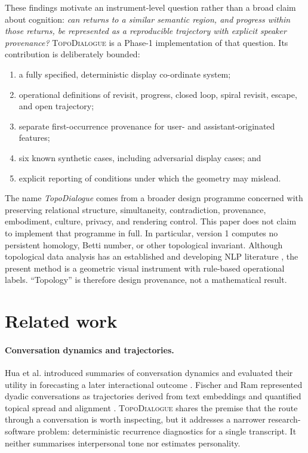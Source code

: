 \documentclass[11pt]{article}
\newcommand{\system}{\textsc{TopoDialogue}}
\begin{document}
These findings motivate an instrument-level question rather than a broad claim
about cognition: \emph{can returns to a similar semantic region, and progress
within those returns, be represented as a reproducible trajectory with explicit
speaker provenance?} \system{} is a Phase-1 implementation of that question.
Its contribution is deliberately bounded:

\begin{enumerate}
  \item a fully specified, deterministic display co-ordinate system;
  \item operational definitions of revisit, progress, closed loop, spiral
        revisit, escape, and open trajectory;
  \item separate first-occurrence provenance for user- and assistant-originated
        features;
  \item six known synthetic cases, including adversarial display cases; and
  \item explicit reporting of conditions under which the geometry may mislead.
\end{enumerate}

The name \emph{TopoDialogue} comes from a broader design programme concerned
with preserving relational structure, simultaneity, contradiction, provenance,
embodiment, culture, privacy, and rendering control. This paper does not claim
to implement that programme in full. In particular, version 1 computes no
persistent homology, Betti number, or other topological invariant. Although
topological data analysis has an established and developing NLP literature
\citep{uchendu2026tda}, the present method is a geometric visual instrument with
rule-based operational labels. ``Topology'' is therefore design provenance,
not a mathematical result.

\section{Related work}

\paragraph{Conversation dynamics and trajectories.}
Hua et al. introduced summaries of conversation dynamics and evaluated their
utility in forecasting a later interactional outcome \citep{hua2024dynamics}.
Fischer and Ram represented dyadic conversations as trajectories derived from
text embeddings and quantified topical spread and alignment
\citep{fischer2024trajectories}. \system{} shares the premise that the route
through a conversation is worth inspecting, but it addresses a narrower
research-software problem: deterministic recurrence diagnostics for a single
transcript. It neither summarises interpersonal tone nor estimates personality.
\end{document}

